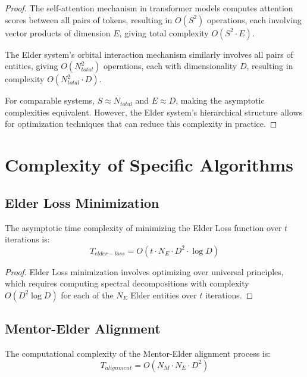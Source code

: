 \begin{proof}
The self-attention mechanism in transformer models computes attention scores between all pairs of tokens, resulting in $O(S^2)$ operations, each involving vector products of dimension $E$, giving total complexity $O(S^2 \cdot E)$.

The Elder system's orbital interaction mechanism similarly involves all pairs of entities, giving $O(N_{total}^2)$ operations, each with dimensionality $D$, resulting in complexity $O(N_{total}^2 \cdot D)$.

For comparable systems, $S \approx N_{total}$ and $E \approx D$, making the asymptotic complexities equivalent. However, the Elder system's hierarchical structure allows for optimization techniques that can reduce this complexity in practice.
\end{proof}

\section{Complexity of Specific Algorithms}

\subsection{Elder Loss Minimization}

\begin{theorem}
The asymptotic time complexity of minimizing the Elder Loss function over $t$ iterations is:
\begin{equation}
T_{elder-loss} = O(t \cdot N_E \cdot D^2 \cdot \log D)
\end{equation}
\end{theorem}

\begin{proof}
Elder Loss minimization involves optimizing over universal principles, which requires computing spectral decompositions with complexity $O(D^2 \log D)$ for each of the $N_E$ Elder entities over $t$ iterations.
\end{proof}

\subsection{Mentor-Elder Alignment}

\begin{theorem}
The computational complexity of the Mentor-Elder alignment process is:
\begin{equation}
T_{alignment} = O(N_M \cdot N_E \cdot D^2)
\end{equation}
\end{theorem}

